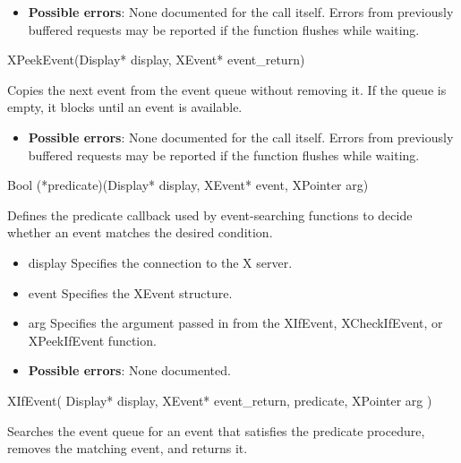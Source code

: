\documentclass{report}
\begin{document}
\begin{itemize}
        \begin{itemize}
            \item \textbf{Possible errors}: None documented for the call itself. Errors from previously buffered requests may be reported if the function flushes while waiting.
        \end{itemize}

        \begin{cppcode}
            XPeekEvent(Display* display, XEvent* event_return)
        \end{cppcode}
        \bigbreak \noindent
        Copies the next event from the event queue without removing it. If the queue is empty, it blocks until an event is available.

        \begin{itemize}
            \item \textbf{Possible errors}: None documented for the call itself. Errors from previously buffered requests may be reported if the function flushes while waiting.
        \end{itemize}

        \begin{cppcode}
            Bool (*predicate)(Display* display, XEvent* event, XPointer arg)
        \end{cppcode}
        \bigbreak \noindent
        Defines the predicate callback used by event-searching functions to decide whether an event matches the desired condition.

        \begin{itemize}
            \item display Specifies the connection to the X server.
            \item event Specifies the XEvent structure.
            \item arg Specifies the argument passed in from the XIfEvent, XCheckIfEvent, or XPeekIfEvent function.
        \end{itemize}

        \begin{itemize}
            \item \textbf{Possible errors}: None documented.
        \end{itemize}

        \begin{cppcode}
            XIfEvent(
                Display* display,
                XEvent* event_return,
                predicate,
                XPointer arg
            )
        \end{cppcode}
        \bigbreak \noindent
        Searches the event queue for an event that satisfies the predicate procedure, removes the matching event, and returns it.


\end{itemize}
\end{document}
